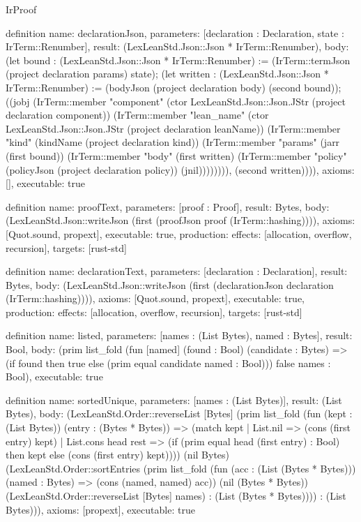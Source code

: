 \begin{lexlean}{IrProof}
\begin{semanticmodule}
definition{
  name: declarationJson,
  parameters: [declaration : Declaration, state : IrTerm::Renumber],
  result: (LexLeanStd.Json::Json * IrTerm::Renumber),
  body: (let bound : (LexLeanStd.Json::Json * IrTerm::Renumber) := (IrTerm::termJson (project declaration params) state); (let written : (LexLeanStd.Json::Json * IrTerm::Renumber) := (bodyJson (project declaration body) (second bound)); ((jobj (IrTerm::member "component" (ctor LexLeanStd.Json::Json.JStr (project declaration component)) (IrTerm::member "lean_name" (ctor LexLeanStd.Json::Json.JStr (project declaration leanName)) (IrTerm::member "kind" (kindName (project declaration kind)) (IrTerm::member "params" (jarr (first bound)) (IrTerm::member "body" (first written) (IrTerm::member "policy" (policyJson (project declaration policy)) (jnil)))))))), (second written)))),
  axioms: [],
  executable: true
}

definition{
  name: proofText,
  parameters: [proof : Proof],
  result: Bytes,
  body: (LexLeanStd.Json::writeJson (first (proofJson proof (IrTerm::hashing)))),
  axioms: [Quot.sound, propext],
  executable: true,
  production: {effects: [allocation, overflow, recursion], targets: [rust-std]}
}

definition{
  name: declarationText,
  parameters: [declaration : Declaration],
  result: Bytes,
  body: (LexLeanStd.Json::writeJson (first (declarationJson declaration (IrTerm::hashing)))),
  axioms: [Quot.sound, propext],
  executable: true,
  production: {effects: [allocation, overflow, recursion], targets: [rust-std]}
}

definition{
  name: listed,
  parameters: [names : (List Bytes), named : Bytes],
  result: Bool,
  body: (prim list_fold (fun [named] (found : Bool) (candidate : Bytes) => (if found then true else (prim equal candidate named : Bool))) false names : Bool),
  executable: true
}

definition{
  name: sortedUnique,
  parameters: [names : (List Bytes)],
  result: (List Bytes),
  body: (LexLeanStd.Order::reverseList [Bytes] (prim list_fold (fun (kept : (List Bytes)) (entry : (Bytes * Bytes)) => (match kept
    | List.nil => (cons (first entry) kept)
    | List.cons head rest => (if (prim equal head (first entry) : Bool) then kept else (cons (first entry) kept)))) (nil Bytes) (LexLeanStd.Order::sortEntries (prim list_fold (fun (acc : (List (Bytes * Bytes))) (named : Bytes) => (cons (named, named) acc)) (nil (Bytes * Bytes)) (LexLeanStd.Order::reverseList [Bytes] names) : (List (Bytes * Bytes)))) : (List Bytes))),
  axioms: [propext],
  executable: true
}


\end{semanticmodule}
\end{lexlean}
